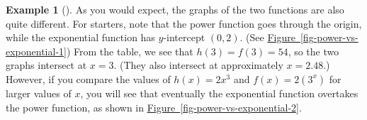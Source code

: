 \documentclass[10pt,]{book}
\theoremstyle{plain}
\theoremstyle{definition}
\theoremstyle{definition}
\theoremstyle{definition}
\newtheorem{example}[theorem]{Example}
\theoremstyle{definition}
\theoremstyle{definition}
\numberwithin{equation}{section}
\newcounter{figstack}
\newlength\fight
\newcommand\pushValignCaptionBottom[5][b]{%
\stepcounter{figstack}%
\expandafter\def\csname %
figalign\romannumeral\value{figstack}\endcsname{#1}%
\expandafter\def\csname %
figtype\romannumeral\value{figstack}\endcsname{#2}%
\expandafter\def\csname %
figwd\romannumeral\value{figstack}\endcsname{#3}%
\expandafter\def\csname %
figcontent\romannumeral\value{figstack}\endcsname{#4}%
\expandafter\def\csname %
figcap\romannumeral\value{figstack}\endcsname{#5}%
\setbox0=\hbox{%
\begin{#2}{#3}#4\end{#2}}%
\ifdim\dimexpr\ht0+\dp0\relax>\fight\global\setlength{\fight}{%
\dimexpr\ht0+\dp0\relax}\fi%
}
\begin{document}
\begin{example}[]
	As you would expect, the graphs of the two functions are also quite different. For starters, note that the power function goes through the origin, while the exponential function has \(y\)-intercept \((0, 2)\). (See \hyperref[fig-power-vs-exponential-1]{Figure~\ref{fig-power-vs-exponential-1}}) From the table, we see that \(h(3) = f(3) = 54\), so the two graphs intersect at \(x = 3\). (They also intersect at approximately \(x = 2.48\).) However, if you compare the values of \(h(x) = 2x^3\) and \(f(x) = 2(3^x)\) for larger values of \(x\), you will see that eventually the exponential function overtakes the power function, as shown in \hyperref[fig-power-vs-exponential-2]{Figure~\ref{fig-power-vs-exponential-2}}.
%
\leavevmode%
\end{example}
\end{document}
